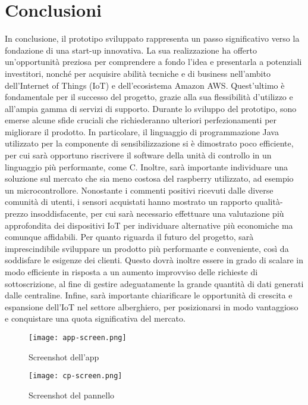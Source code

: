 \section{Conclusioni}
In conclusione, il prototipo sviluppato rappresenta un passo significativo verso la fondazione di una start-up innovativa. La sua realizzazione ha offerto un'opportunità preziosa per comprendere a fondo l'idea e presentarla a potenziali investitori, nonché per acquisire abilità tecniche e di business nell'ambito dell'Internet of Things (IoT) e dell'ecosistema Amazon AWS. Quest'ultimo è fondamentale per il successo del progetto, grazie alla sua flessibilità d'utilizzo e all'ampia gamma di servizi di supporto.
%
Durante lo sviluppo del prototipo, sono emerse alcune sfide cruciali che richiederanno ulteriori perfezionamenti per migliorare il prodotto. In particolare, il linguaggio di programmazione Java utilizzato per la componente di sensibilizzazione si è dimostrato poco efficiente, per cui sarà opportuno riscrivere il software della unità di controllo in un linguaggio più performante, come C. Inoltre, sarà importante individuare una soluzione sul mercato che sia meno costosa del raspberry utilizzato, ad esempio un microcontrollore.
%
Nonostante i commenti positivi ricevuti dalle diverse comunità di utenti, i sensori acquistati hanno mostrato un rapporto qualità-prezzo insoddisfacente, per cui sarà necessario effettuare una valutazione più approfondita dei dispositivi IoT per individuare alternative più economiche ma comunque affidabili.
%
Per quanto riguarda il futuro del progetto, sarà imprescindibile sviluppare un prodotto più performante e conveniente, così da soddisfare le esigenze dei clienti. Questo dovrà inoltre essere in grado di scalare in modo efficiente in risposta a un aumento improvviso delle richieste di sottoscrizione, al fine di gestire adeguatamente la grande quantità di dati generati dalle centraline.
%
Infine, sarà importante chiarificare le opportunità di crescita e espansione dell'IoT nel settore alberghiero, per posizionarsi in modo vantaggioso e conquistare una quota significativa del mercato.

\begin{figure}[H]
    \begin{minipage}{0.37\textwidth}
    \hspace*{-0.3cm}\texttt{[image: app-screen.png]}
    \caption[contextmap]{Screenshot dell'app}
    \label{fig:app1}
    \end{minipage}
    \begin{minipage}{0.62\textwidth}
    \hspace*{0.5cm}\texttt{[image: cp-screen.png]}
    \caption[contextmap]{Screenshot del pannello}
    \label{fig:app2}
    \end{minipage}
    \centering
\end{figure}

